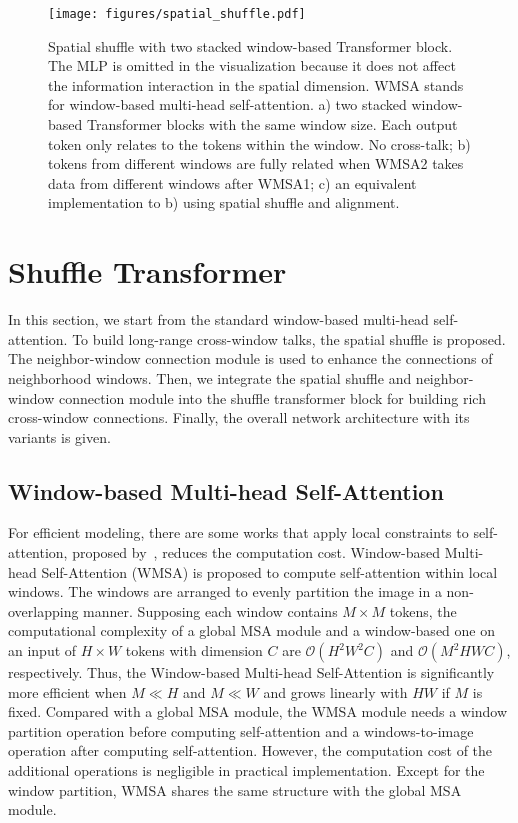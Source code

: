 \documentclass{article}
\begin{document}
\begin{figure*}[!t]
    \centering
    \texttt{[image: figures/spatial\_shuffle.pdf]}
    \caption{Spatial shuffle with two stacked window-based Transformer block. The MLP is omitted in the visualization because it does not affect the information interaction in the spatial dimension. WMSA stands for window-based multi-head self-attention. a) two stacked window-based Transformer blocks with the same window size. Each output token only relates to the tokens within the window. No cross-talk; b) tokens from different windows are fully related when WMSA2 takes data from different windows after WMSA1; c) an equivalent implementation to b) using spatial shuffle and alignment. 
    }
    \label{fig:spatial_shuffle}
    \vspace{0mm}
\end{figure*}

\section{Shuffle Transformer}
In this section, we start from the standard window-based multi-head self-attention. To build long-range cross-window talks, the spatial shuffle is proposed. The neighbor-window connection module is used to enhance the connections of neighborhood windows. Then, we integrate the spatial shuffle and neighbor-window connection module into the shuffle transformer block for building rich cross-window connections. Finally, the overall network architecture with its variants is given.

\subsection{Window-based Multi-head Self-Attention}
For efficient modeling, there are some works that apply local constraints to self-attention, proposed by~\cite{hu2019local,ramachandran2019stand,wang2020axial,liu2021Swin}, reduces the computation cost. Window-based Multi-head Self-Attention (WMSA) is proposed to compute self-attention within local windows. The windows are arranged to evenly partition the image in a non-overlapping manner. Supposing each window contains $M \times M$ tokens, the computational complexity of a global MSA module and a window-based one on an input of $H \times W$ tokens with dimension $C$ are $\mathcal{O}(H^2W^2C)$ and $\mathcal{O}(M^2HWC)$, respectively. Thus, the Window-based Multi-head Self-Attention is significantly more efficient when $M \ll H$ and $M \ll W$ and grows linearly with $HW$ if $M$ is fixed. Compared with a global MSA module, the WMSA module needs a window partition operation before computing self-attention and a windows-to-image operation after computing self-attention. However, the computation cost of the additional operations is negligible in practical implementation. Except for the window partition, WMSA shares the same structure with the global MSA module.
\end{document}

